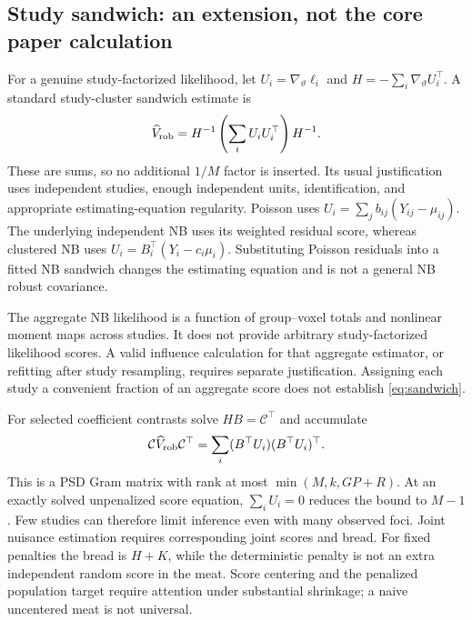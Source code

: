 \documentclass[11pt,a4paper]{article}
\numberwithin{equation}{section}
\begin{document}
\subsection{Study sandwich: an extension, not the core paper calculation}
For a genuine study-factorized likelihood, let
$U_i=\nabla_\vartheta\ell_i$ and $H=-\sum_i\nabla_\vartheta U_i^\top$.
A standard study-cluster sandwich estimate is
\begin{equation}
 \widehat V_{\rm rob}=H^{-1}\left(\sum_iU_iU_i^\top\right)H^{-1}.
 \label{eq:sandwich}
\end{equation}
These are sums, so no additional $1/M$ factor is inserted.
Its usual justification uses independent studies, enough independent units,
identification, and appropriate estimating-equation regularity.
Poisson uses $U_i=\sum_jb_{ij}(Y_{ij}-\mu_{ij})$.
The underlying independent NB uses its weighted residual score, whereas
clustered NB uses $U_i=B_i^\top(Y_i-c_i\mu_i)$.
Substituting Poisson residuals into a fitted NB sandwich changes the
estimating equation and is not a general NB robust covariance.

The aggregate NB likelihood is a function of group--voxel totals and
nonlinear moment maps across studies. It does not provide arbitrary
study-factorized likelihood scores. A valid influence calculation for
that aggregate estimator, or refitting after study resampling, requires
separate justification. Assigning each study a convenient fraction of
an aggregate score does not establish \eqref{eq:sandwich}.

For selected coefficient contrasts solve $HB=\mathcal C^\top$ and accumulate
\begin{equation}
 \mathcal C\widehat V_{\rm rob}\mathcal C^\top
 =\sum_i(B^\top U_i)(B^\top U_i)^\top .
\end{equation}
This is a PSD Gram matrix with rank at most $\min(M,k,GP+R)$.
At an exactly solved unpenalized score equation, $\sum_iU_i=0$
reduces the bound to $M-1$. Few studies can therefore limit inference
even with many observed foci.
Joint nuisance estimation requires corresponding joint scores and bread.
For fixed penalties the bread is $H+K$, while the deterministic penalty
is not an extra independent random score in the meat.
Score centering and the penalized population target require attention
under substantial shrinkage; a naive uncentered meat is not universal.
\end{document}
